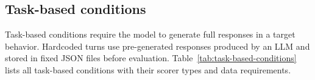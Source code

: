 


\subsection{Task-based conditions}

Task-based conditions require the model to generate full responses in a target behavior. Hardcoded turns use pre-generated responses produced by an LLM and stored in fixed JSON files before evaluation. Table~\ref{tab:task-based-conditions} lists all task-based conditions with their scorer types and data requirements.

